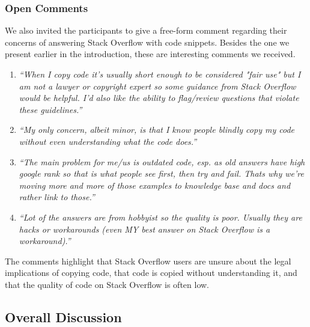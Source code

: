 \documentclass[10pt,journal,compsoc]{IEEEtran}
\begin{document}
\subsubsection{Open Comments} We also invited the participants to give a
free-form comment regarding their concerns of answering Stack Overflow with code
snippets. Besides the one we present earlier in the introduction, these are
interesting comments we received.

\begin{enumerate}
	\item \textit{``When I copy code it's usually short enough to be considered "fair
		use" but I am not a lawyer or copyright expert so some guidance from Stack Overflow would be
		helpful. I'd also like the ability to flag/review questions that violate these
		guidelines.''}
	\item \textit{``My only concern, albeit minor, is that I know people blindly copy
		my code without even understanding what the code does.''}
	\item \textit{``The main problem for me/us is outdated code, esp. as old answers
		have high google rank so that is what people see first, then try and fail. Thats
		why we're moving more and more of those examples to knowledge base and docs and
		rather link to those.''}
	\item \textit{``Lot of the answers are from hobbyist so the quality is poor.
		Usually they are hacks or workarounds (even MY best answer on Stack Overflow is a
		workaround).''}
\end{enumerate}

The comments highlight that Stack Overflow users are unsure about the
legal implications of copying code, that code is copied without
understanding it, and that the quality of code on Stack Overflow is
often low.

\subsection{Overall Discussion} %
\end{document}

